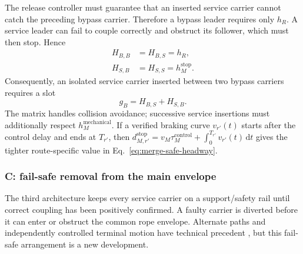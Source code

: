 \documentclass[11pt,a4paper]{scrartcl}
\begin{document}
The release controller must guarantee that an inserted service carrier cannot
catch the preceding bypass carrier.  Therefore a bypass leader requires only
$h_R$.  A service leader can fail to couple correctly and obstruct its
follower, which must then stop.  Hence
\begin{align}
H_{B,B}&=H_{B,S}=h_R,\\
H_{S,B}&=H_{S,S}=h_M^{\mathrm{stop}}.
\label{eq:architecture-b}
\end{align}
Consequently, an isolated service carrier inserted between two bypass carriers
requires a slot
\begin{equation}
g_B=H_{B,S}+H_{S,B}.
\label{eq:architecture-b-slot}
\end{equation}
The matrix handles collision avoidance; successive service insertions must
additionally respect $h_M^{\mathrm{mechanical}}$.  If a verified braking curve
$v_{r'}(t)$ starts after the control delay and ends at $T_{r'}$, then
$d_{M,r'}^{\mathrm{stop}}=v_M\tau_M^{\mathrm{control}}+
\int_0^{T_{r'}}v_{r'}(t)\,\mathrm dt$ gives the tighter route-specific value in
Eq.~\eqref{eq:merge-safe-headway}.

\subsubsection{C: fail-safe removal from the main envelope}

The third architecture keeps every service carrier on a support/safety rail
until correct coupling has been positively confirmed.  A faulty carrier is
diverted before it can enter or obstruct the common rope envelope.  Alternate
paths and independently controlled terminal motion have technical precedent
\cite{lsmRopewayPatent}, but this fail-safe arrangement is a new development.
\end{document}
